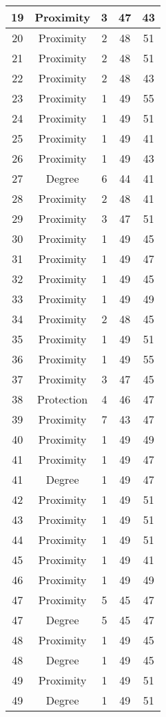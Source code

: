 \documentclass[results.tex]{subfiles}
\begin{document}
\begin{center}
\begin{tabular}{| c || c | c | c | c |}
    19 & Proximity & 3 & 47 & 43 \\ 
    \hline
    20 & Proximity & 2 & 48 & 51 \\ 
    \hline
    21 & Proximity & 2 & 48 & 51 \\ 
    \hline
    22 & Proximity & 2 & 48 & 43 \\ 
    \hline
    23 & Proximity & 1 & 49 & 55 \\ 
    \hline
    24 & Proximity & 1 & 49 & 51 \\ 
    \hline
    25 & Proximity & 1 & 49 & 41 \\ 
    \hline
    26 & Proximity & 1 & 49 & 43 \\ 
    \hline
    27 & Degree & 6 & 44 & 41 \\ 
    \hline
    28 & Proximity & 2 & 48 & 41 \\ 
    \hline
    29 & Proximity & 3 & 47 & 51 \\ 
    \hline
    30 & Proximity & 1 & 49 & 45 \\ 
    \hline
    31 & Proximity & 1 & 49 & 47 \\ 
    \hline
    32 & Proximity & 1 & 49 & 45 \\ 
    \hline
    33 & Proximity & 1 & 49 & 49 \\ 
    \hline
    34 & Proximity & 2 & 48 & 45 \\ 
    \hline
    35 & Proximity & 1 & 49 & 51 \\ 
    \hline
    36 & Proximity & 1 & 49 & 55 \\ 
    \hline
    37 & Proximity & 3 & 47 & 45 \\ 
    \hline
    38 & Protection & 4 & 46 & 47 \\ 
    \hline
    39 & Proximity & 7 & 43 & 47 \\ 
    \hline
    40 & Proximity & 1 & 49 & 49 \\ 
    \hline
    41 & Proximity & 1 & 49 & 47 \\ 
    \hline
    41 & Degree & 1 & 49 & 47 \\ 
    \hline
    42 & Proximity & 1 & 49 & 51 \\ 
    \hline
    43 & Proximity & 1 & 49 & 51 \\ 
    \hline
    44 & Proximity & 1 & 49 & 51 \\ 
    \hline
    45 & Proximity & 1 & 49 & 41 \\ 
    \hline
    46 & Proximity & 1 & 49 & 49 \\ 
    \hline
    47 & Proximity & 5 & 45 & 47 \\ 
    \hline
    47 & Degree & 5 & 45 & 47 \\ 
    \hline
    48 & Proximity & 1 & 49 & 45 \\ 
    \hline
    48 & Degree & 1 & 49 & 45 \\ 
    \hline
    49 & Proximity & 1 & 49 & 51 \\ 
    \hline
    49 & Degree & 1 & 49 & 51 \\ 
    \hline   \end{tabular}
\end{center}
\end{document}
